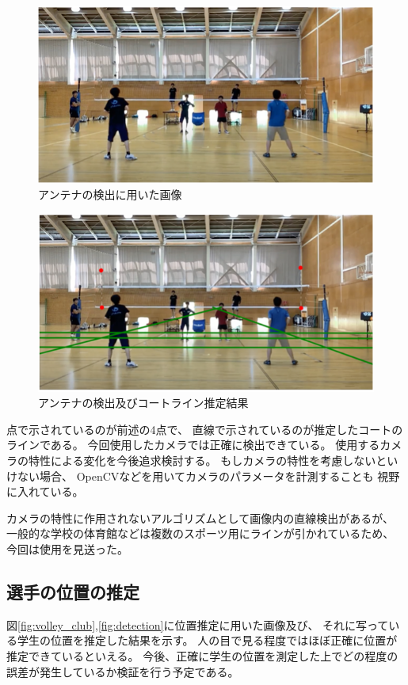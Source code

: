 \documentclass[twoside,twocolumn]{jsarticle}
\begin{document}
		\begin{figure}[h]
			\centering
			\includegraphics[width=0.8\hsize]{antenna_original.png}
			\caption{アンテナの検出に用いた画像}
			\label{fig:antenna_original}
		\end{figure}

		\begin{figure}[h]
			\centering
			\includegraphics[width=0.8\hsize]{antenna.png}
			\caption{アンテナの検出及びコートライン推定結果}
			\label{fig:antenna}
		\end{figure}

		点で示されているのが前述の4点で、
		直線で示されているのが推定したコートのラインである。
		今回使用したカメラでは正確に検出できている。
		使用するカメラの特性による変化を今後追求検討する。
		もしカメラの特性を考慮しないといけない場合、
		OpenCV\cite{Bradski}などを用いてカメラのパラメータを計測することも
		視野に入れている。

		カメラの特性に作用されないアルゴリズムとして画像内の直線検出があるが、
		一般的な学校の体育館などは複数のスポーツ用にラインが引かれているため、
		今回は使用を見送った。

	\subsection{選手の位置の推定} \label{sec:pos_result}
		図\ref{fig:volley_club},\ref{fig:detection}に位置推定に用いた画像及び、
		それに写っている学生の位置を推定した結果を示す。
		人の目で見る程度ではほぼ正確に位置が推定できているといえる。
		今後、正確に学生の位置を測定した上でどの程度の誤差が発生しているか検証を行う予定である。
\end{document}
